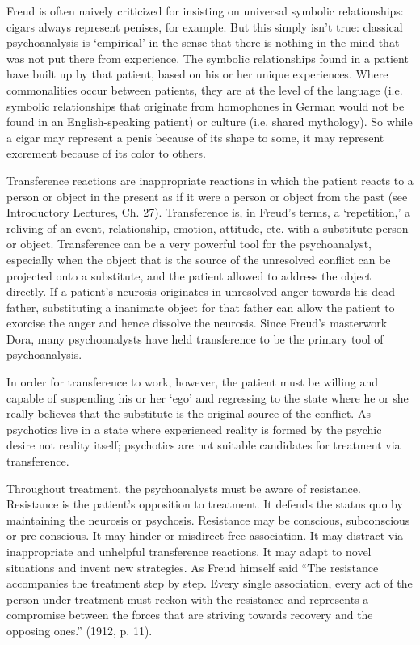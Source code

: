 Freud is often naively criticized for insisting on universal symbolic relationships: cigars always represent penises, for example. But this simply isn't true: classical psychoanalysis is `empirical' in the sense that there is nothing in the mind that was not put there from experience. The symbolic relationships found in a patient have built up by that patient, based on his or her unique experiences. Where commonalities occur between patients, they are at the level of the language (i.e. symbolic relationships that originate from homophones in German would not be found in an English-speaking patient) or culture (i.e. shared mythology). So while a cigar may represent a penis because of its shape to some, it may represent excrement because of its color to others.

Transference reactions are inappropriate reactions in which the patient reacts to a person or object in the present as if it were a person or object from the past (see Introductory Lectures, Ch. 27). Transference is, in Freud's terms, a `repetition,' a reliving of an event, relationship, emotion, attitude, etc. with a substitute person or object. Transference can be a very powerful tool for the psychoanalyst, especially when the object that is the source of the unresolved conflict can be projected onto a substitute, and the patient allowed to address the object directly. If a patient's neurosis originates in unresolved anger towards his dead father, substituting a inanimate object for that father can allow the patient to exorcise the anger and hence dissolve the neurosis. Since Freud's masterwork Dora, many psychoanalysts have held transference to be the primary tool of psychoanalysis.

In order for transference to work, however, the patient must be willing and capable of suspending his or her `ego' and regressing to the state where he or she really believes that the substitute is the original source of the conflict. As psychotics live in a state where experienced reality is formed by the psychic desire not reality itself; psychotics are not suitable candidates for treatment via transference.

Throughout treatment, the psychoanalysts must be aware of resistance. Resistance is the patient's opposition to treatment. It defends the status quo by maintaining the neurosis or psychosis. Resistance may be conscious, subconscious or pre-conscious. It may hinder or misdirect free association. It may distract via inappropriate and unhelpful transference reactions. It may adapt to novel situations and invent new strategies. As Freud himself said “The resistance accompanies the treatment step by step. Every single association, every act of the person under treatment must reckon with the resistance and represents a compromise between the forces that are striving towards recovery and the opposing ones.” (1912, p. 11).

